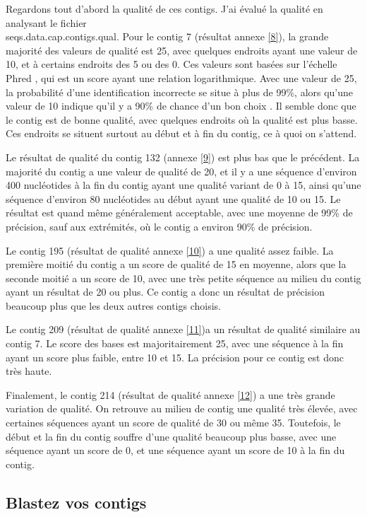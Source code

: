 \documentclass[10.9pt]{article} %
\begin{document}
Regardons tout d'abord la qualité de ces contigs. J'ai évalué la qualité en analysant le fichier\\
seqs.data.cap.contigs.qual. Pour le contig 7 (résultat annexe \ref{8}),
la grande majorité des valeurs de qualité est 25, avec quelques endroits ayant une valeur de 10,
et à certains endroits des 5 ou des 0.
Ces valeurs sont basées sur l'échelle Phred \cite{Wikipedia-phred}, qui est un score ayant une relation logarithmique. 
Avec une valeur de 25,  la probabilité d'une identification incorrecte se situe à plus de 99\%, 
alors qu'une valeur de 10 indique qu'il y a 90\% de chance d'un bon choix . Il semble donc que le
contig est de bonne qualité, avec quelques endroits où la qualité est plus basse. Ces endroits
se situent surtout au début et à fin du contig, ce à quoi on s'attend.

Le résultat de qualité du contig 132 (annexe \ref{9}) est plus bas que le précédent. 
La majorité du contig a une valeur de qualité de 20, et il y a une séquence d'environ 400
nucléotides à la fin du contig ayant une qualité variant de 0 à 15, ainsi qu'une séquence
d'environ 80 nucléotides au début ayant une qualité de 10 ou 15. Le résultat est quand même
généralement acceptable, avec une moyenne de 99\% de précision, sauf aux extrémités, 
où le contig a environ 90\% de précision.

Le contig 195 (résultat de qualité annexe \ref{10}) a une qualité assez faible. La première
moitié du contig a un score de qualité de 15 en moyenne, alors que la seconde moitié a un
score de 10, avec une très petite séquence au milieu du contig ayant un résultat de 20 ou plus.
Ce contig a donc un résultat de précision beaucoup plus que les deux autres contigs choisis.

Le contig 209 (résultat de qualité annexe \ref{11})a un résultat de qualité similaire au contig 7.
Le score des bases est majoritairement 25, avec une séquence à la fin ayant un score plus faible,
entre 10 et 15. La précision pour ce contig est donc très haute.

Finalement, le contig 214 (résultat de qualité annexe \ref{12}) a une très grande variation de
qualité. On retrouve au milieu de contig une qualité très élevée, avec certaines séquences ayant un
score de qualité de 30 ou même 35. Toutefois, le début et la fin du contig souffre d'une qualité
beaucoup plus basse, avec une séquence ayant un score de 0, et une séquence ayant un score
de 10 à la fin du contig.

\subsection[Blast des contigs]{Blastez vos contigs}
\end{document}
